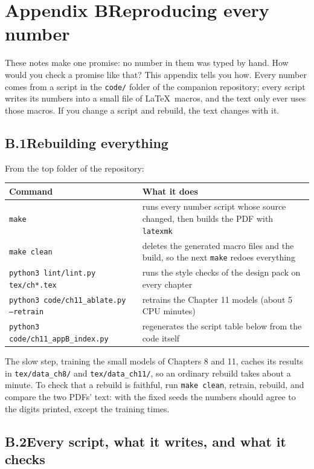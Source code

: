 \newpage
\section*{Appendix B\quad Reproducing every number}


These notes make one promise: no number in them was typed by hand. How would you check a promise like
that? This appendix tells you how. Every number comes from a script in the \texttt{code/} folder of the companion
repository; every script writes its numbers into a small file of \LaTeX\ macros, and the text only ever
uses those macros. If you change a script and rebuild, the text changes with it.

\subsection*{B.1\quad Rebuilding everything}

From the top folder of the repository:
\begin{center}
\small
\begin{tabular}{@{}P{6.2cm} P{7.6cm}@{}}
\toprule
Command & What it does\\
\midrule
\texttt{make} & runs every number script whose source changed, then builds the PDF with \texttt{latexmk}\\
\texttt{make clean} & deletes the generated macro files and the build, so the next \texttt{make} redoes everything\\
\texttt{python3 lint/lint.py tex/ch*.tex} & runs the style checks of the design pack on every chapter\\
\texttt{python3 code/ch11\_ablate.py --retrain} & retrains the Chapter 11 models (about 5 CPU minutes)\\
\texttt{python3 code/ch11\_appB\_index.py} & regenerates the script table below from the code itself\\
\bottomrule
\end{tabular}
\end{center}
The slow step, training the small models of Chapters 8 and 11, caches its results in \texttt{tex/data\_ch8/}
and \texttt{tex/data\_ch11/}, so an ordinary rebuild takes about a minute. To check that a rebuild is
faithful, run \texttt{make clean}, retrain, rebuild, and compare the two PDFs' text: with the fixed seeds
the numbers should agree to the digits printed, except the training times.

\subsection*{B.2\quad Every script, what it writes, and what it checks}

